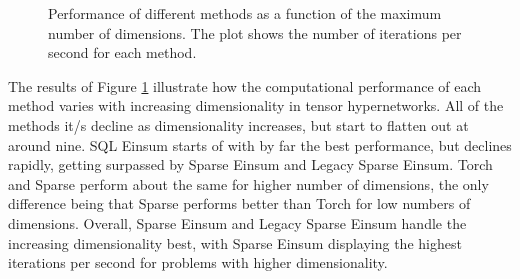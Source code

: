 \begin{figure}[H]
    \caption{Performance of different methods as a function of the maximum number of dimensions. The plot shows the number of iterations per second for each method.}
    \label{fig:exp:max_num_dim}
\end{figure}

\noindent
The results of Figure \ref{fig:exp:max_num_dim} illustrate how the computational performance
of each method varies with increasing dimensionality in tensor hypernetworks. All of the methods
it/s decline as dimensionality increases, but start to flatten out at around nine. SQL Einsum
starts of with by far the best performance, but declines rapidly, getting surpassed by Sparse Einsum
and Legacy Sparse Einsum. Torch and Sparse perform about the same for higher number of dimensions,
the only difference being that Sparse performs better than Torch for low numbers of dimensions.
Overall, Sparse Einsum and Legacy Sparse Einsum handle the increasing dimensionality best, with
Sparse Einsum displaying the highest iterations per second for problems with higher dimensionality.

